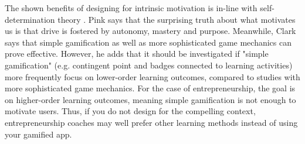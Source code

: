 The shown benefits of designing for intrinsic motivation is in-line with self-determination theory \citep{deci} \citep{ryan}.  Pink \citep{pink} says that the surprising truth about what motivates us is that drive is fostered by autonomy, mastery and purpose. Meanwhile, Clark \citep{gates} says that simple gamification as well as more sophisticated game mechanics can prove effective. However, he adds that it should be investigated if "simple gamification" (e.g. contingent point and badges connected to learning activities) more frequently focus on lower-order learning outcomes, compared to studies with more sophisticated game mechanics. For the case of entrepreneurship, the goal is on higher-order learning outcomes, meaning simple gamification is not enough to motivate users. Thus, if you do not design for the compelling context, entrepreneurship coaches may well prefer other learning methods instead of using your gamified app.
